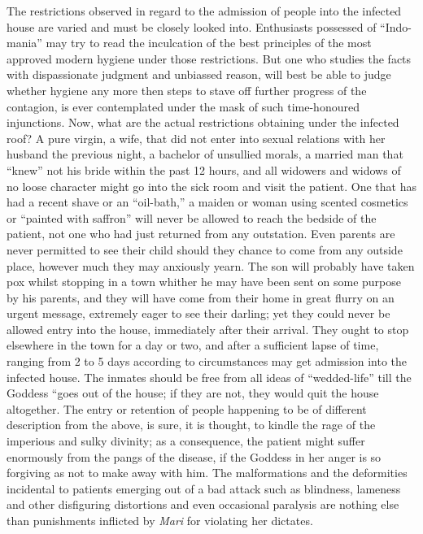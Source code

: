 \documentclass[a4paper, 12pt, oneside, english, twocolumn]{article}
\begin{document}
The restrictions observed in regard to the admission of people into the infected house are varied and must be closely looked into. Enthusiasts possessed of ``Indo-mania'' may try to read the inculcation of the best principles of the most approved modern hygiene under those restrictions. But one who studies the facts with dispassionate judgment and unbiassed reason, will best be able to judge whether hygiene any more then steps to stave off further progress of the contagion, is ever contemplated under the mask of such time-honoured injunctions. Now, what are the actual restrictions obtaining under the infected roof? A pure virgin, a wife, that did not enter into sexual relations with her husband the previous night, a bachelor of unsullied morals, a married man that ``knew'' not his bride within the past 12 hours, and all widowers and widows of no loose character might go into the sick room and visit the patient. One that has had a recent shave or an ``oil-bath,'' a maiden or woman using scented cosmetics or ``painted with saffron'' will never be allowed to reach the bedside of the patient, not one who had just returned from any outstation. Even parents are never permitted to see their child should they chance to come from any outside place, however much they may anxiously yearn. The son will probably have taken pox whilst stopping in a town whither he may have been sent on some purpose by his parents, and they will have come from their home in great flurry on an urgent message, extremely eager to see their darling; yet they could never be allowed entry into the house, immediately after their arrival. They ought to stop elsewhere in the town for a day or two, and after a sufficient lapse of time, ranging from 2 to 5 days according to circumstances may get admission into the infected house. The inmates should be free from all ideas of ``wedded-life'' till the Goddess ``goes out of the house; if they are not, they would quit the house altogether. The entry or retention of people happening to be of different description from the above, is sure, it is thought, to kindle the rage of the imperious and sulky divinity; as a consequence, the patient might suffer enormously from the pangs of the disease, if the Goddess in her anger is so forgiving as not to make away with him. The malformations and the deformities incidental to patients emerging out of a bad attack such as blindness, lameness and other disfiguring distortions and even occasional paralysis are nothing else than punishments inflicted by \emph{Mari} for violating her dictates.
\end{document}

